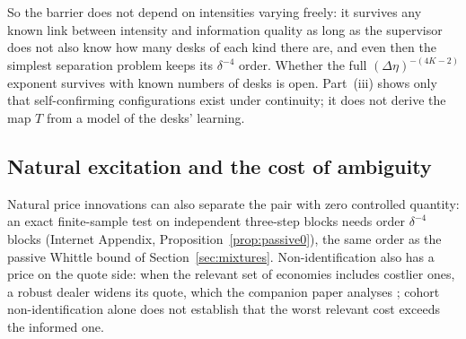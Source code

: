 So the barrier does not depend on intensities varying freely: it survives any known link between intensity and information quality as long as the supervisor does not also know how many desks of each kind there are, and even then the simplest separation problem keeps its $\delta^{-4}$ order. Whether the full $(\Delta\eta)^{-(4K-2)}$ exponent survives with known numbers of desks is open. Part~(iii) shows only that self-confirming configurations exist under continuity; it does not derive the map $T$ from a model of the desks' learning.

\subsection{Natural excitation and the cost of ambiguity}

Natural price innovations can also separate the pair with zero controlled quantity: an exact finite-sample test on independent three-step blocks needs order $\delta^{-4}$ blocks (Internet Appendix, Proposition~\ref{prop:passive0}), the same order as the passive Whittle bound of Section~\ref{sec:mixtures}. Non-identification also has a price on the quote side: when the relevant set of economies includes costlier ones, a robust dealer widens its quote, which the companion paper analyses \citep{niroula2026b}; cohort non-identification alone does not establish that the worst relevant cost exceeds the informed one.

